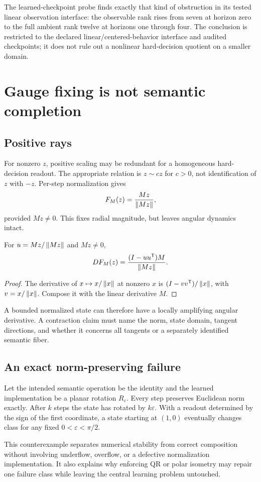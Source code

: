\documentclass[11pt]{article}
\begin{document}
The learned-checkpoint probe finds exactly that kind of obstruction in its tested linear observation interface: the observable rank rises from seven at horizon zero to the full ambient rank twelve at horizons one through four. The conclusion is restricted to the declared linear/centered-behavior interface and audited checkpoints; it does not rule out a nonlinear hard-decision quotient on a smaller domain. \cite{nlp}

\section{Gauge fixing is not semantic completion}
\subsection{Positive rays}
For nonzero \(z\), positive scaling may be redundant for a homogeneous hard-decision readout. The appropriate relation is \(z\sim cz\) for \(c>0\), not identification of \(z\) with \(-z\). Per-step normalization gives
\[
 F_M(z)=\frac{Mz}{\left\lVert Mz\right\rVert},
\]
provided \(Mz\ne0\). This fixes radial magnitude, but leaves angular dynamics intact.

\begin{proposition}\label{prop:derivative}
For \(u=Mz/\left\lVert Mz\right\rVert\) and \(Mz\ne0\),
\[
 DF_M(z)=\frac{(I-uu^{\mathsf T})M}{\left\lVert Mz\right\rVert}.
\]
\end{proposition}
\begin{proof}
The derivative of \(x\mapsto x/\left\lVert x\right\rVert\) at nonzero \(x\) is \((I-vv^{\mathsf T})/\left\lVert x\right\rVert\), with \(v=x/\left\lVert x\right\rVert\). Compose it with the linear derivative \(M\).
\end{proof}
A bounded normalized state can therefore have a locally amplifying angular derivative. A contraction claim must name the norm, state domain, tangent directions, and whether it concerns all tangents or a separately identified semantic fiber.

\subsection{An exact norm-preserving failure}
\begin{counterexample}\label{ex:rotation}
Let the intended semantic operation be the identity and the learned implementation be a planar rotation \(R_\varepsilon\). Every step preserves Euclidean norm exactly. After \(k\) steps the state has rotated by \(k\varepsilon\). With a readout determined by the sign of the first coordinate, a state starting at \((1,0)\) eventually changes class for any fixed \(0<\varepsilon<\pi/2\).
\end{counterexample}
This counterexample separates numerical stability from correct composition without involving underflow, overflow, or a defective normalization implementation. It also explains why enforcing QR or polar isometry may repair one failure class while leaving the central learning problem untouched.
\end{document}
